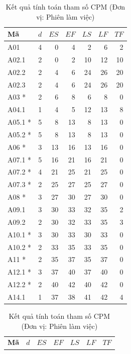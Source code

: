 \begin{table}[H]
\centering
\caption{Kết quả tính toán tham số CPM (Đơn vị: Phiên làm việc)}\label{tab:cpm}
\begingroup\footnotesize
\setlength{\tabcolsep}{2pt}\renewcommand{\arraystretch}{1.18}
\begin{minipage}[t]{.46\linewidth}
\vspace{0pt}\centering
\begin{tabular*}{\linewidth}{@{\extracolsep{\fill}}lrrrrrr@{}}
\toprule
\textbf{Mã} & $d$ & $ES$ & $EF$ & $LS$ & $LF$ & $TF$ \\
\midrule
A01 & 4 & 0 & 4 & 2 & 6 & 2 \\
A02.1 & 2 & 0 & 2 & 10 & 12 & 10 \\
A02.2 & 2 & 4 & 6 & 24 & 26 & 20 \\
A02.3 & 2 & 4 & 6 & 24 & 26 & 20 \\
A03 * & 2 & 6 & 8 & 6 & 8 & 0 \\
A04.1 & 1 & 4 & 5 & 12 & 13 & 8 \\
A05.1 * & 5 & 8 & 13 & 8 & 13 & 0 \\
A05.2 * & 5 & 8 & 13 & 8 & 13 & 0 \\
A06 * & 3 & 13 & 16 & 13 & 16 & 0 \\
A07.1 * & 5 & 16 & 21 & 16 & 21 & 0 \\
A07.2 * & 4 & 21 & 25 & 21 & 25 & 0 \\
A07.3 * & 2 & 25 & 27 & 25 & 27 & 0 \\
A08 * & 3 & 27 & 30 & 27 & 30 & 0 \\
A09.1 & 3 & 30 & 33 & 32 & 35 & 2 \\
A09.2 & 2 & 30 & 32 & 33 & 35 & 3 \\
A10.1 * & 3 & 30 & 33 & 30 & 33 & 0 \\
A10.2 * & 2 & 33 & 35 & 33 & 35 & 0 \\
A11 * & 2 & 35 & 37 & 35 & 37 & 0 \\
A12.1 * & 3 & 37 & 40 & 37 & 40 & 0 \\
A12.2 * & 2 & 40 & 42 & 40 & 42 & 0 \\
A14.1 & 1 & 37 & 38 & 41 & 42 & 4 \\
\bottomrule
\end{tabular*}
\end{minipage}\hfill
\begin{minipage}[t]{.46\linewidth}
\vspace{0pt}\centering
\begin{tabular*}{\linewidth}{@{\extracolsep{\fill}}lrrrrrr@{}}
\toprule
\textbf{Mã} & $d$ & $ES$ & $EF$ & $LS$ & $LF$ & $TF$ \\

\end{tabular*}
\end{minipage}
\end{table}
